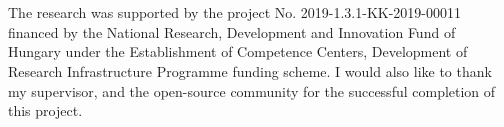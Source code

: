 \documentclass[
]{elteikthesis}[2024/04/26]
\begin{document}

\cleardoublepage


\cleardoublepage

\chapter*{\acklabel}
The research was supported by the project No. 2019-1.3.1-KK-2019-00011 financed by the National Research, Development and Innovation Fund of Hungary under the Establishment of Competence Centers, Development of Research Infrastructure Programme funding scheme. I would also like to thank my supervisor, and the open-source community for the successful completion of this project.
{}
\printbibliography[title=\biblabel]
\cleardoublepage

{}
\listoffigures
\cleardoublepage

{}
\listoftables
\cleardoublepage

{}
\listofequations
\cleardoublepage

\printglossary[type=\acronymtype, title=Acronyms]
\end{document}
